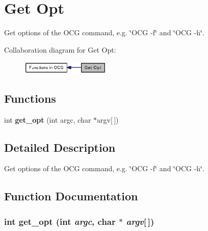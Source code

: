 \section{Get Opt}
\label{group____get__opt}
Get options of the OCG command, e.g. \char`\"{}OCG -f\char`\"{} and \char`\"{}OCG -h\char`\"{}.  




Collaboration diagram for Get Opt:\nopagebreak
\begin{figure}[H]
\begin{center}
\leavevmode
\includegraphics[width=120pt]{group____get__opt}
\end{center}
\end{figure}
\subsection*{Functions}
\begin{CompactItemize}
\item 
int {\bf get\_\-opt} (int argc, char $\ast$argv[$\,$])
\end{CompactItemize}


\subsection{Detailed Description}
Get options of the OCG command, e.g. \char`\"{}OCG -f\char`\"{} and \char`\"{}OCG -h\char`\"{}. 

\subsection{Function Documentation}
\subsubsection[{get\_\-opt}]{\setlength{\rightskip}{0pt plus 5cm}int get\_\-opt (int {\em argc}, \/  char $\ast$ {\em argv}[$\,$])}\label{group____get__opt_g8b95dd202084d1f3c860a738cfb8b38a}


